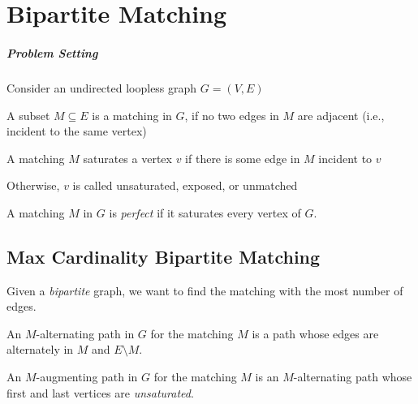 \chapter{Bipartite Matching}



\paragraph{Problem Setting}
Consider an undirected loopless graph $G=(V,E)$

\begin{definition}[Matching]
A subset $M\subseteq E$ is a matching in $G$, if no two edges in $M$ are adjacent (i.e., incident to the same vertex)
\end{definition}

\begin{definition}[Saturation]
A matching $M$ saturates a vertex $v$ if there is some edge in $M$ incident to $v$

Otherwise, $v$ is called unsaturated, exposed, or unmatched

A matching $M$ in $G$ is \emph{perfect} if it saturates every vertex of $G$.
\end{definition}

\section{Max Cardinality Bipartite Matching}
Given a \emph{bipartite} graph, we want to find the matching with the most number of edges.
\begin{definition}[M-alternating]
An $M$-alternating path in $G$ for the matching $M$ is a path whose edges are alternately in $M$ and $E\setminus M$.

An $M$-augmenting path in $G$ for the matching $M$ is an $M$-alternating path whose first and last vertices are \emph{unsaturated}.
\end{definition}


